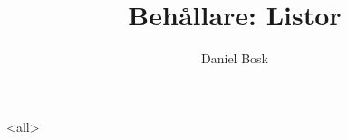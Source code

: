 \documentclass[ignoreframetext]{beamer}
\begin{document}
\title{%
  Behållare: Listor
}
\author{Daniel Bosk}

\begin{frame}
  \maketitle
\end{frame}

\mode<all>

\mode*
%

\end{document}
